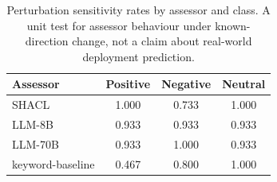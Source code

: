 \begin{table}[htbp]
\centering
\caption{Perturbation sensitivity rates by assessor and class. A unit test for assessor behaviour under known-direction change, not a claim about real-world deployment prediction.}
\label{tab:perturbation_sensitivity}
\begin{tabular}{lccc}
\toprule
Assessor & Positive & Negative & Neutral \\
\midrule
SHACL & 1.000 & 0.733 & 1.000 \\
LLM-8B & 0.933 & 0.933 & 0.933 \\
LLM-70B & 0.933 & 1.000 & 0.933 \\
keyword-baseline & 0.467 & 0.800 & 1.000 \\
\bottomrule
\end{tabular}
\end{table}
